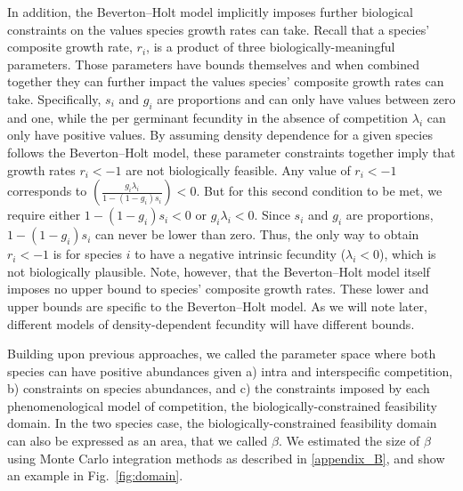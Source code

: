 \begin{refsection}
In addition, the Beverton--Holt model implicitly imposes further biological constraints on the values species growth rates can take. Recall that a species' composite growth rate, $r_{i}$, is a product of three biologically-meaningful parameters. Those parameters have bounds themselves and when combined together they can further impact the values species' composite growth rates can take. Specifically, $s_{i}$ and $g_{i}$ are proportions and can only have values between zero and one, while the per germinant fecundity in the absence of competition $\lambda_{i}$ can only have positive values. By assuming density dependence for a given species follows the Beverton--Holt model, these parameter constraints together imply that growth rates $r_i < -1$ are not biologically feasible. Any value of $r_{i} < -1$ corresponds to $\left( \frac{g_{i}\lambda_{i}}{1-(1-g_{i})s_{i}} \right) < 0$. But for this second condition to be met, we require either $1-(1-g_{i})s_{i} < 0$ or $g_{i}\lambda_{i} < 0$. Since $s_{i}$ and $g_{i}$ are proportions, $1-(1-g_{i})s_{i}$ can never be lower than zero.  Thus, the only way to obtain $r_{i} < -1$ is for species $i$ to have a negative intrinsic fecundity ($\lambda_i < 0$), which is not biologically plausible. Note, however, that the Beverton--Holt model itself imposes no upper bound to species' composite growth rates. These lower and upper bounds are specific to the Beverton--Holt model. As we will note later, different models of density-dependent fecundity will have different bounds.


Building upon previous approaches, we called the parameter space where both species can have positive abundances given a) intra and interspecific competition, b) constraints on species abundances, and c) the constraints imposed by each phenomenological model of competition, the biologically-constrained feasibility domain. In the two species case,  the biologically-constrained feasibility domain can also be expressed as an area, that we called $\beta$. We estimated the size of $\beta$ using Monte Carlo integration methods as described in \autoref{appendix_B}, and show an example in Fig.~\ref{fig:domain}.


\end{refsection}
